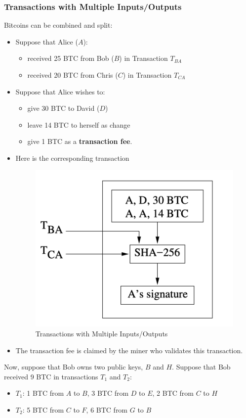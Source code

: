 \documentclass[12pt,titlepage]{article}
\begin{document}
\subsubsection{Transactions with Multiple Inputs/Outputs}
Bitcoins can be combined and split: \begin{itemize}
	\item Suppose that Alice ($A$):\begin{itemize}
		\item received 25 BTC from Bob ($B$) in Transaction $T_{BA}$
		\item received 20 BTC from Chris ($C$) in Transaction $T_{CA}$
	\end{itemize}
	\item Suppose that Alice wishes to:\begin{itemize}
		\item give 30 BTC to David ($D$)
		\item leave 14 BTC to herself as change
		\item give 1 BTC as a \textbf{transaction fee}.
	\end{itemize}
	\item Here is the corresponding transaction
	\begin{center}
		\begin{figure}[h!]
			\centering
			\includegraphics[width=.4\textwidth]{Transactions_with_Multiple_IO.png}
			\caption{Transactions with Multiple Inputs/Outputs}
		\end{figure}
	\end{center}
	\item The transaction fee is claimed by the miner who validates this transaction.
\end{itemize}
Now, suppose that Bob owns two public keys, $B$ and $H$. Suppose that Bob received 9 BTC in transactions $T_1$ and $T_2$:\begin{itemize}
	\item $T_1$: 1 BTC from $A$ to $B$, 3 BTC from $D$ to $E$, 2 BTC from $C$ to $H$
	\item $T_2$: 5 BTC from $C$ to $F$, 6 BTC from $G$ to $B$
\end{itemize}
\end{document}
